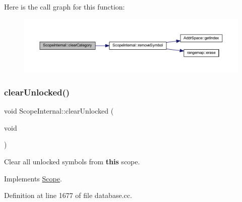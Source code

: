 Here is the call graph for this function\+:
\nopagebreak
\begin{figure}[H]
\begin{center}
\leavevmode
\includegraphics[width=350pt]{class_scope_internal_a4139d0dd5d98849bd42291246cdb2f9a_cgraph}
\end{center}
\end{figure}
\mbox{\label{class_scope_internal_ab95e3712f0b536e014bfb3c8d3d2287a}} 
\subsubsection{\texorpdfstring{clearUnlocked()}{clearUnlocked()}}
{\footnotesize\ttfamily void Scope\+Internal\+::clear\+Unlocked (\begin{DoxyParamCaption}\item[{void}]{ }\end{DoxyParamCaption})\hspace{0.3cm}{\ttfamily [virtual]}}



Clear all unlocked symbols from {\bfseries{this}} scope. 



Implements \mbox{\hyperlink{class_scope_ac7d58385a87dca33d128300c666e5064}{Scope}}.



Definition at line 1677 of file database.\+cc.

